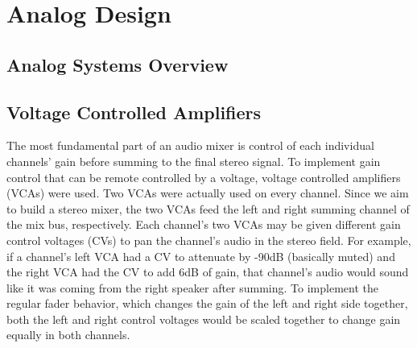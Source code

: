 \documentclass[11pt, letterpaper,titlepage]{article}
\begin{document}
\section{Analog Design}

\subsection{Analog Systems Overview}



\subsection{Voltage Controlled Amplifiers}
\label{sec:vca}
The most fundamental part of an audio mixer is control of each individual channels' gain before summing to the final stereo signal. To implement gain control that can be remote controlled by a voltage, voltage controlled amplifiers (VCAs) were used. Two VCAs were actually used on every channel. Since we aim to build a stereo mixer, the two VCAs feed the left and right summing channel of the mix bus, respectively. Each channel's two VCAs may be given different gain control voltages (CVs) to pan the channel's audio in the stereo field. For example, if a channel's left VCA had a CV to attenuate by -90dB (basically muted) and the right VCA had the CV to add 6dB of gain, that channel's audio would sound like it was coming from the right speaker after summing. To implement the regular fader behavior, which changes the gain of the left and right side together, both the left and right control voltages would be scaled together to change gain equally in both channels.
\end{document}

